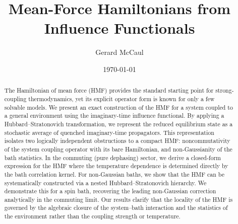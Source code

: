 \documentclass[aps,prl,twocolumn,superscriptaddress,showpacs]{revtex4-2}
\begin{document}
\title{Mean-Force Hamiltonians from Influence Functionals}
\author{Gerard McCaul}
\date{\today}

\begin{abstract}
The Hamiltonian of mean force (HMF) provides the standard starting point for strong-coupling thermodynamics, yet its explicit operator form is known for only a few solvable models. We present an exact construction of the HMF for a system coupled to a general environment using the imaginary-time influence functional. By applying a Hubbard--Stratonovich transformation, we represent the reduced equilibrium state as a stochastic average of quenched imaginary-time propagators. This representation isolates two logically independent obstructions to a compact HMF: noncommutativity of the system coupling operator with its bare Hamiltonian, and non-Gaussianity of the bath statistics. In the commuting (pure dephasing) sector, we derive a closed-form expression for the HMF where the temperature dependence is determined directly by the bath correlation kernel. For non-Gaussian baths, we show that the HMF can be systematically constructed via a nested Hubbard--Stratonovich hierarchy. We demonstrate this for a spin bath, recovering the leading non-Gaussian correction analytically in the commuting limit. Our results clarify that the locality of the HMF is governed by the algebraic closure of the system--bath interaction and the statistics of the environment rather than the coupling strength or temperature.
\end{abstract}

\maketitle






% 



\end{document}
